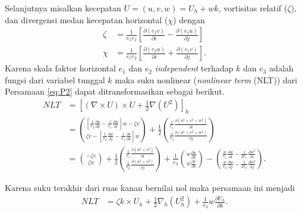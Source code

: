 \begin{spacing}{1.5}
	Selanjutnya misalkan kecepatan $U=(u,v,w)=U_h+wk$, vortisitas relatif ($\zeta$), dan divergensi medan kecepatan horizontal ($\chi$) dengan
	\begin{equation}
		\begin{aligned}
			\zeta &= \frac{1}{e_1e_2}\left[\frac{\partial (e_2v)}{\partial i}-\frac{\partial (e_1u)}{\partial j}\right]\\
			\chi &= \frac{1}{e_1e_2}\left[\frac{\partial (e_2u)}{\partial i}+\frac{\partial (e_1v)}{\partial j}\right].
		\end{aligned}
	\label{eq:divhor}
	\end{equation}
	Karena skala faktor horizontal $e_1$ dan $e_2$ \textit{independent} terhadap $k$ dan $e_3$ adalah fungsi dari variabel tunggal $k$ maka suku nonlinear (\textit{nonlinear term} (NLT)) dari Persamaan \ref{eq:P2} dapat ditransformasikan sebagai berikut.
	\begin{equation*}
		\begin{aligned}
			NLT &= \left[(\nabla \times U)\times U+\frac{1}{2}\nabla(U^2)\right]_h \\
			 &= \binom{\left[\frac{1}{e_3}\frac{\partial u}{\partial k}-\frac{1}{e_1}\frac{\partial w}{\partial i}\right]w-\zeta v}{\zeta v-\left[\frac{1}{e_2}\frac{\partial w}{\partial j}-\frac{1}{e_3}\frac{\partial v}{\partial k}\right]w}+\frac{1}{2}\binom{\frac{1}{e_1}\frac{\partial (u^2+v^2+w^2)}{\partial i}}{\frac{1}{e_2}\frac{\partial (u^2+v^2+w^2)}{\partial j}}\\
			 &=\binom{-\zeta v}{\zeta u}+\frac{1}{2}\binom{\frac{1}{e_1}\frac{\partial (u^2+v^2)}{\partial i}}{\frac{1}{e_2}\frac{\partial (u^2+v^2)}{\partial j}}+\frac{1}{e_3}\binom{w\frac{\partial u}{\partial k}}{w\frac{\partial v}{\partial k}}-\binom{\frac{w}{e_1}\frac{\partial w}{\partial i}-\frac{1}{2e_1}\frac{\partial w^2}{\partial i}}{\frac{w}{e_2}\frac{\partial w}{\partial j}-\frac{1}{2e_2}\frac{\partial w^2}{\partial j}}.
		\end{aligned}
	\end{equation*}
	
	Karena suku terakhir dari ruas kanan bernilai nol maka persamaan ini menjadi
	\begin{equation}
		\begin{aligned}
			NLT &= \zeta k \times U_h + \frac{1}{2}\nabla_h (U^2_h) + \frac{1}{e_3}w\frac{\partial U_h}{\partial k}.
		\end{aligned}
		\label{eq:flux_1}
	\end{equation}
	

\end{spacing}
